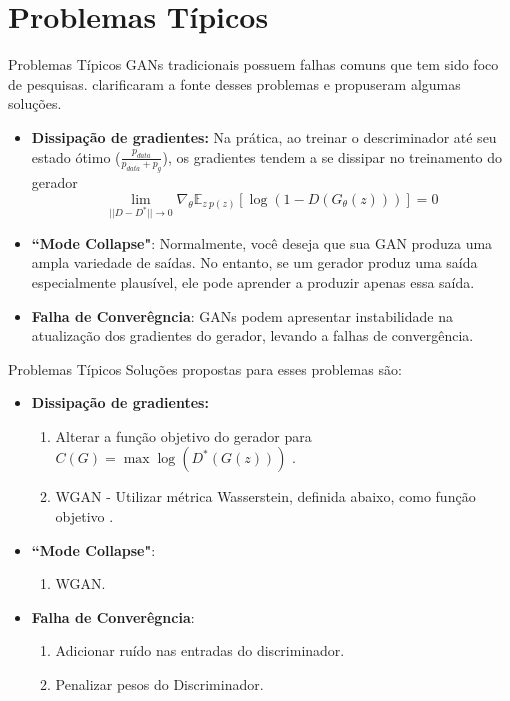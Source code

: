\documentclass[10pt]{beamer}
\begin{document}
\section[Problemas Típicos]{Problemas Típicos}
\begin{frame}[fragile]{Problemas Típicos}
GANs tradicionais possuem falhas comuns que tem sido foco
de pesquisas. \citet{arjovsky2017} clarificaram a fonte desses
problemas e propuseram algumas soluções.
\small
\begin{itemize}
	\item \textbf{Dissipação de gradientes:} Na prática, ao treinar
	o descriminador até seu estado ótimo ($\frac{p_{data}}
	{p_{data} + p_g}$), os gradientes tendem a se dissipar
	no treinamento do gerador
  $$\lim_{||D-D^*||\to0}\nabla_{\theta}\mathbb{E}_{z~p(z)}\left[\log{(1-D(G_{\theta}(z)))}\right] = 0$$

  \item  \textbf{``Mode Collapse"}: Normalmente, você deseja que sua GAN
  produza uma ampla variedade de saídas. No entanto, se um gerador produz
  uma saída especialmente plausível, ele pode aprender a produzir apenas
  essa saída.

  \item \textbf{Falha de Converêgncia}: GANs podem apresentar instabilidade
  na atualização dos gradientes do gerador, levando a falhas de
  convergência.
\end{itemize}

\end{frame}

\begin{frame}[fragile]{Problemas Típicos}
Soluções propostas para esses problemas são:
\small
\begin{itemize}
	\item \textbf{Dissipação de gradientes:}
	\begin{enumerate}
		\item Alterar a função objetivo do gerador para
		$C(G) = \max \log(D^*(G(z)))$ \citep{goodfellow2014}.
		\item WGAN - Utilizar métrica Wasserstein, definida abaixo,
		como função objetivo \citep{wgan2017}.
	\end{enumerate}

  \item  \textbf{``Mode Collapse"}:
	\begin{enumerate}
		\item WGAN.
	\end{enumerate}

  \item \textbf{Falha de Converêgncia}:
	\begin{enumerate}
		\item Adicionar ruído nas entradas do discriminador.
  
  		\item Penalizar pesos do Discriminador.

	\end{enumerate}
\end{itemize}

\end{frame}
\end{document}
